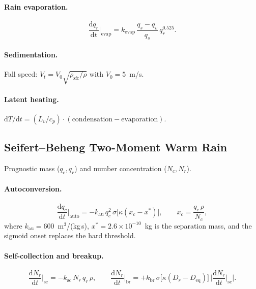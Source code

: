 \documentclass[11pt,twoside]{report}
\newcommand{\dd}{\mathrm{d}}
\newcommand{\cpd}{c_p}
\newcommand{\Lv}{L_v}
\begin{document}
\paragraph{Rain evaporation.}
\begin{equation}
  \frac{\dd q_r}{\dd t}\bigg|_{\mathrm{evap}}
  = k_{\mathrm{evap}}\,\frac{q_s-q_v}{q_s}\,q_r^{0.525}.
\end{equation}

\paragraph{Sedimentation.}
Fall speed: $V_t = V_0\sqrt{\rho_{\mathrm{sfc}}/\rho}$ with $V_0=5$~m/s.

\paragraph{Latent heating.}
$\dd T/\dd t = (\Lv/\cpd)\cdot(\text{condensation} - \text{evaporation})$.

\subsection{Seifert--Beheng Two-Moment Warm Rain}

Prognostic mass ($q_c,q_r$) and number concentration ($N_c,N_r$).

\paragraph{Autoconversion.}
\begin{equation}
  \frac{\dd q_c}{\dd t}\bigg|_{\mathrm{auto}}
  = -k_{\mathrm{au}}\,q_c^2\,
  \sigma\!\bigl[\kappa(x_c - x^*)\bigr],
  \qquad x_c = \frac{q_c\,\rho}{N_c},
\end{equation}
where $k_{\mathrm{au}}=600$~m$^3$/(kg\,s), $x^*=2.6\times 10^{-10}$~kg
is the separation mass, and the sigmoid onset replaces the hard threshold.

\paragraph{Self-collection and breakup.}
\begin{equation}
  \frac{\dd N_r}{\dd t}\bigg|_{\mathrm{sc}}
  = -k_{\mathrm{sc}}\,N_r\,q_r\,\rho,
  \qquad
  \frac{\dd N_r}{\dd t}\bigg|_{\mathrm{br}}
  = +k_{\mathrm{br}}\,\sigma\bigl[\kappa(D_r-D_{\mathrm{eq}})\bigr]\,
  \bigl|\frac{\dd N_r}{\dd t}\big|_{\mathrm{sc}}\bigr|.
\end{equation}
\end{document}
